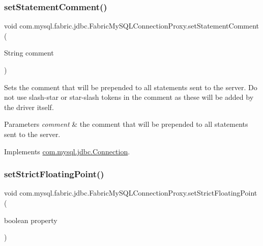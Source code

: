 \subsubsection{\texorpdfstring{set\+Statement\+Comment()}{setStatementComment()}}
{\footnotesize\ttfamily void com.\+mysql.\+fabric.\+jdbc.\+Fabric\+My\+S\+Q\+L\+Connection\+Proxy.\+set\+Statement\+Comment (\begin{DoxyParamCaption}\item[{String}]{comment }\end{DoxyParamCaption})}

Sets the comment that will be prepended to all statements sent to the server. Do not use slash-\/star or star-\/slash tokens in the comment as these will be added by the driver itself.


\begin{DoxyParams}{Parameters}
{\em comment} & the comment that will be prepended to all statements sent to the server. \\
\hline
\end{DoxyParams}


Implements \mbox{\hyperlink{interfacecom_1_1mysql_1_1jdbc_1_1_connection_a94f38f8f7d8afd2a7bf6c87ad0d5d422}{com.\+mysql.\+jdbc.\+Connection}}.

\mbox{\label{classcom_1_1mysql_1_1fabric_1_1jdbc_1_1_fabric_my_s_q_l_connection_proxy_aef128837e0d751b5e31d33c7166821e7}} 
\subsubsection{\texorpdfstring{set\+Strict\+Floating\+Point()}{setStrictFloatingPoint()}}
{\footnotesize\ttfamily void com.\+mysql.\+fabric.\+jdbc.\+Fabric\+My\+S\+Q\+L\+Connection\+Proxy.\+set\+Strict\+Floating\+Point (\begin{DoxyParamCaption}\item[{boolean}]{property }\end{DoxyParamCaption})}


